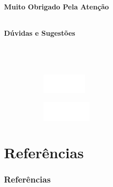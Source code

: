 \documentclass[aspectratio=169,t,xcolor=table]{beamer}
\begin{document}
\begin{frame}

	\centering
	\vspace{2cm}

	\textbf{\Huge Muito Obrigado Pela Atenção}

	\ \\

	\textbf{Dúvidas e Sugestões}
	\ \\

	 \\
	 \\
	 \\
	\vspace{2cm}
	\begin{figure}
		\centering
		\begin{subfigure}{0.2\textwidth}
			\centering
			\includegraphics[height=1cm]{lib/logos/icmc.png}
		\end{subfigure}
		\qquad
		\begin{subfigure}{0.2\textwidth}
			\centering
			\includegraphics[height=1cm]{lib/logos/logo_usp_white.png}
		\end{subfigure}

	\end{figure}

\end{frame}



\section{Referências}
\begin{frame}[allowframebreaks]
	\frametitle{Referências}
	\smaller
	
	\nocite{}
	
\end{frame}
\end{document}
